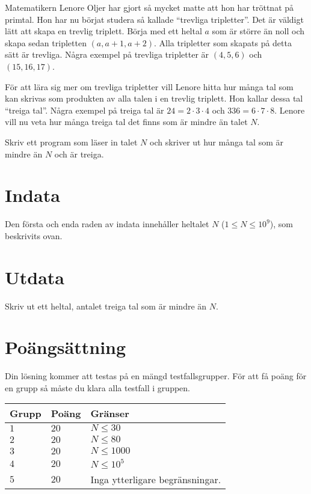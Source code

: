 \noindent

Matematikern Lenore Oljer har gjort så mycket matte att hon har tröttnat på primtal. 
Hon har nu börjat studera så kallade ``trevliga tripletter''. 
Det är väldigt lätt att skapa en trevlig triplett. 
Börja med ett heltal $a$ som är
större än noll och skapa sedan tripletten $(a,a+1,a+2)$. 
Alla tripletter som skapats på detta sätt är trevliga. 
Några exempel på trevliga tripletter är $(4,5,6)$ och $(15,16,17)$.

För att lära sig mer om trevliga tripletter vill Lenore hitta hur 
många tal som kan skrivas som produkten av
alla talen i en trevlig triplett. Hon kallar dessa tal ``treiga tal''. 
Några exempel på treiga tal är $24=2 \cdot 3 \cdot 4$
och $336 = 6 \cdot 7 \cdot 8$. Lenore vill nu veta hur många treiga tal det 
finns som är mindre än talet $N$.

Skriv ett program som läser in talet $N$ och skriver ut hur många tal som är mindre än
$N$ och är treiga.

\section*{Indata}
Den första och enda raden av indata innehåller heltalet $N$ ($1 \le N \le 10^9$), som beskrivits ovan.


\section*{Utdata}
Skriv ut ett heltal, antalet treiga tal som är mindre än $N$.


\section*{Poängsättning}
Din lösning kommer att testas på en mängd testfallsgrupper.
För att få poäng för en grupp så måste du klara alla testfall i gruppen.

\noindent
\begin{tabular}{| l | l | p{12cm} |}
  \hline
  \textbf{Grupp} & \textbf{Poäng} & \textbf{Gränser} \\ \hline
  $1$    & $20$       & $N \leq 30$ \\ \hline
  $2$    & $20$       & $N \leq 80$ \\ \hline
  $3$    & $20$       & $N \leq 1000$ \\ \hline
  $4$    & $20$       & $N \leq 10^5$ \\ \hline
  $5$    & $20$       & Inga ytterligare begränsningar. \\ \hline
\end{tabular}
